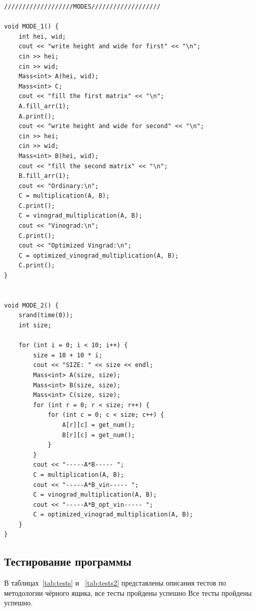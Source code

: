 \documentclass[14pt]{article}
\begin{document}
\begin{lstlisting}[label = list1, caption = Программная реализация]
///////////////////MODES///////////////////

void MODE_1() {
	int hei, wid;
	cout << "write height and wide for first" << "\n";
	cin >> hei;
	cin >> wid;
	Mass<int> A(hei, wid);
	Mass<int> C;
	cout << "fill the first matrix" << "\n";
	A.fill_arr(1);
	A.print();
	cout << "write height and wide for second" << "\n";
	cin >> hei;
	cin >> wid;
	Mass<int> B(hei, wid);
	cout << "fill the second matrix" << "\n";
	B.fill_arr(1);
	cout << "Ordinary:\n";
	C = multiplication(A, B);
	C.print();
	C = vinograd_multiplication(A, B);
	cout << "Vinograd:\n";
	C.print();
	cout << "Optimized Vingrad:\n";
	C = optimized_vinograd_multiplication(A, B);
	C.print();
}


void MODE_2() {
	srand(time(0));
	int size;
	
	for (int i = 0; i < 10; i++) {
		size = 10 + 10 * i;
		cout << "SIZE: " << size << endl;
		Mass<int> A(size, size);
		Mass<int> B(size, size);
		Mass<int> C(size, size);
		for (int r = 0; r < size; r++) {
			for (int c = 0; c < size; c++) {
				A[r][c] = get_num();
				B[r][c] = get_num();
			}
		}
		cout << "-----A*B----- ";
		C = multiplication(A, B);
		cout << "-----A*B_vin----- ";
		C = vinograd_multiplication(A, B);
		cout << "-----A*B_opt_vin----- ";
		C = optimized_vinograd_multiplication(A, B);
	}
}
\end{lstlisting}
	
\newpage
\subsection{Тестирование программы}

В таблицах~\ref{tab:tests} и ~\ref{tab:tests2} представлены описания тестов по методологии чёрного ящика, все тесты пройдены успешно
Все тесты пройдены успешно.
\end{document}
